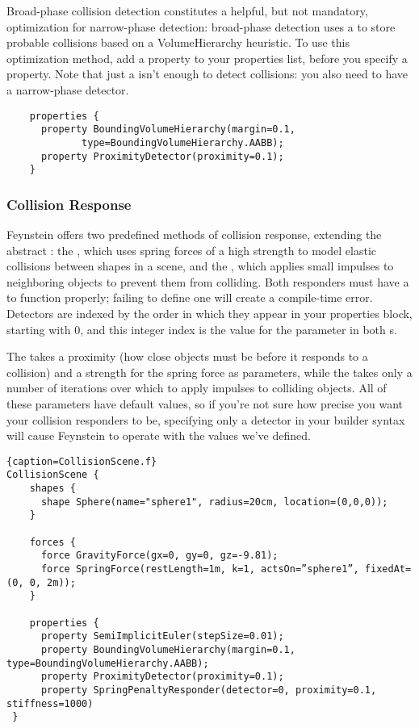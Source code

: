Broad-phase collision detection constitutes a helpful, but not
mandatory, optimization for narrow-phase detection: broad-phase
detection uses a  to store probable
collisions based on a VolumeHierarchy heuristic. To use this
optimization method, add a  property to
your properties list, before you specify a 
property. Note that just a  isn't enough
to detect collisions: you also need to have a narrow-phase detector.

\begin{lstlisting}
    properties {
      property BoundingVolumeHierarchy(margin=0.1, 
             type=BoundingVolumeHierarchy.AABB);
      property ProximityDetector(proximity=0.1);
    }
\end{lstlisting}

\subsubsection{Collision Response}

Feynstein offers two predefined methods of collision response,
extending the abstract : the
, which uses spring forces of a high
strength to model elastic collisions between shapes in a scene, and
the , which applies small impulses to
neighboring objects to prevent them from colliding. Both responders
must have a  to function properly; failing to
define one will create a compile-time error. Detectors are indexed by
the order in which they appear in your properties block, starting with
0, and this integer index is the value for the 
parameter in both s.

The  takes a proximity (how close objects
must be before it responds to a collision) and a strength for the
spring force as parameters, while the  takes
only a number of iterations over which to apply impulses to colliding
objects. All of these parameters have default values, so if you're not
sure how precise you want your collision responders to be, specifying
only a detector in your builder syntax will cause Feynstein to operate
with the values we've defined.

\begin{lstlisting}{caption=CollisionScene.f}
CollisionScene {
    shapes {
      shape Sphere(name="sphere1", radius=20cm, location=(0,0,0));
    }

    forces {
      force GravityForce(gx=0, gy=0, gz=-9.81);
      force SpringForce(restLength=1m, k=1, actsOn=”sphere1”, fixedAt=(0, 0, 2m));
    }

    properties {
      property SemiImplicitEuler(stepSize=0.01);
      property BoundingVolumeHierarchy(margin=0.1, type=BoundingVolumeHierarchy.AABB);
      property ProximityDetector(proximity=0.1);
      property SpringPenaltyResponder(detector=0, proximity=0.1, stiffness=1000)
 }
\end{lstlisting}
